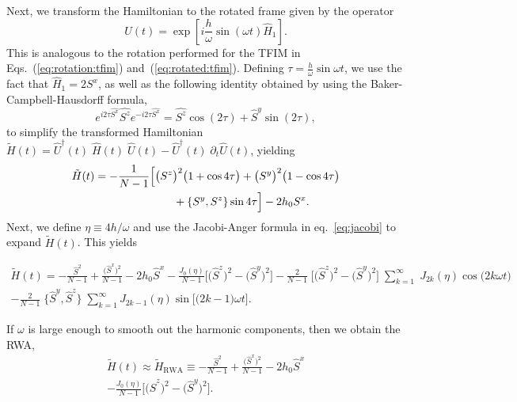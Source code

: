 \documentclass[%
reprint,
superscriptaddress,
amsmath,amssymb,
aps,
prb,
showkeys,
]{revtex4-2}
\begin{document}
Next, we transform the Hamiltonian to the rotated frame given by the operator
\begin{equation}
	\hat{U}(t)=\exp [i \frac{h}{\omega} \sin (\omega t) \hat{H}_{1}].
\end{equation}
This is analogous to the rotation performed for the TFIM in Eqs.~(\ref{eq:rotation:tfim}) and~(\ref{eq:rotated:tfim}). Defining $\tau = \displaystyle\frac{h}{\omega}\sin{\omega t}$, we use the fact that $\hat{H}_1 = 2 S^x$, as well as the following identity obtained by using the Baker-Campbell-Hausdorff formula,
\begin{equation}
	e^{i 2\tau\hat{S^{x}}} \hat{S^{z}} e^{-i 2\tau \hat{S^{x}}}=\hat{S^{z}} \cos \left(2\tau\right)+\hat{S}^{y} \sin (2\tau),
\end{equation}
to simplify the transformed Hamiltonian $\tilde{H}(t) = \hat{U}^\dagger(t)\;\hat{H}(t)\;\hat{U}(t) - \hat{U}^\dagger(t)\;\partial_t\hat{U}(t)$, yielding
\begin{align}
	\label{eq:lmg_rotated}
	\tilde{H}(t)& = -\frac{1}{N-1}\Big[\big(S^z\big)^2 \big(1+\cos{4\tau}\big)+ \big(S^y\big)^2 \big(1-\cos{4\tau}\big)\nonumber \\  
	&\hskip 2.5cm + \pb{S^y}{S^z}
	\sin{4\tau}\Big] - 2 h_0 S^x.
\end{align}
Next, we define $\eta\equiv 4h/\omega$ and use the Jacobi-Anger formula in eq.~\ref{eq:jacobi}
to expand $\tilde{H}(t)$. This yields
\begin{widetext}
	\begin{multline}
		\label{eq:lmg_jacobiexp}
		\tilde{H}(t)= -\frac{\hat{S}^2}{N-1} +  \frac{\big(\hat{S}^x\big)^{2}}{N-1} - 2h_0 \hat{S}^x - \frac{J_0(\eta)}{N-1}\bigg[\big(\hat{S}^z\big)^{2} - \big(\hat{S}^y\big)^{2} \bigg] - \frac{2}{N-1}\;\Big[\big( \hat{S}^z\big)^2 - \big( \hat{S}^y\big)^2\Big]\;\sum^\infty_{k=1}\;J_{2k}(\eta)\cos{\big(2k\omega t\big)}\\
		- \frac{2}{N-1}\;\big\{ \hat{S}^y,  \hat{S}^z \big\}\;\sum^\infty_{k=1}J_{2k-1}(\eta)  \sin{\Big[\big(2k-1\big)\omega t\Big]}.
	\end{multline}
\end{widetext}
If $\omega$ is large enough to smooth out the harmonic components, then we obtain the RWA,
\begin{multline}
	\tilde{H}(t)\approx \tilde{H}_{\mathrm{RWA}}\equiv -\frac{\hat{S}^2}{N-1} +  \frac{\big(\hat{S}^x\big)^{2}}{N-1} - 2h_0 \hat{S}^x\\
	- \frac{J_0(\eta)}{N-1}\bigg[\big(\hat{S}^z\big)^{2} - \big(\hat{S}^y\big)^{2} \bigg].
	\label{eq:lmg_rwa}
\end{multline}
\end{document}

